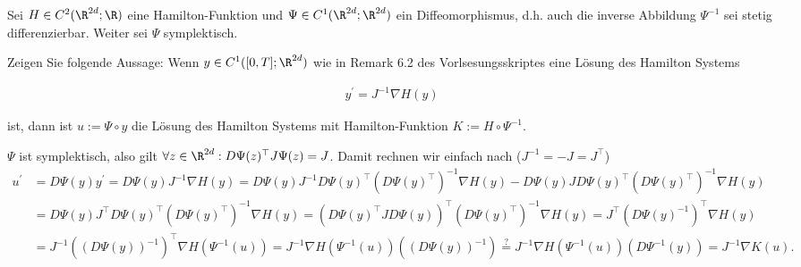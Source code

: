 \begin{exercise}
  Sei $H \in C^2(\R^{2d};\R)$ eine Hamilton-Funktion und
  $\Psi \in C^1(\R^{2d};\R^{2d})$ ein Diffeomorphismus,
  d.h. auch die inverse Abbildung $\Psi^{-1}$ sei stetig
  differenzierbar. Weiter sei $\Psi$ symplektisch.

  Zeigen Sie folgende Aussage: Wenn $y \in C^1([0,T];\R^{2d})$
  wie in Remark 6.2 des Vorlsesungsskriptes eine Lösung des
  Hamilton Systems

  \begin{align}
    y^\prime = J^{-1}\nabla H(y)
  \end{align}

  ist, dann ist $u := \Psi \circ y$ die Lösung des Hamilton
  Systems mit Hamilton-Funktion $K := H \circ \Psi^{-1}$.
\end{exercise}

\begin{solution}
  $\Psi$ ist symplektisch, also gilt $\forall z \in \R^{2d}: D\Psi(z)^{\top}J\Psi(z) = J$.
  Damit rechnen wir einfach nach ($J^{-1} = -J = J^{\top}$)
  \begin{align*}
    u^{\prime} &= D \Psi(y)y^{\prime} = D\Psi(y)J^{-1}\nabla H(y) =  D\Psi(y)J^{-1}D\Psi(y)^{\top}(D\Psi(y)^{\top})^{-1}\nabla H(y)
    -D\Psi(y)JD\Psi(y)^{\top}(D\Psi(y)^{\top})^{-1}\nabla H(y) \\
    &= D\Psi(y)J^{\top}D\Psi(y)^{\top}(D\Psi(y)^{\top})^{-1}\nabla H(y)
    = (D\Psi(y)^{\top}JD\Psi(y))^{\top}(D\Psi(y)^{\top})^{-1}\nabla H(y)
    = J^{\top}(D\Psi(y)^{-1})^{\top}\nabla H(y) \\
    &= J^{-1}((D\Psi(y))^{-1})^{\top}\nabla H(\Psi^{-1}(u))
    = J^{-1}\nabla H(\Psi^{-1}(u))((D\Psi(y))^{-1}) \stackrel{?}{=}
    J^{-1}\nabla H(\Psi^{-1}(u))(D\Psi^{-1}(y)) = J^{-1}\nabla K(u).
  \end{align*}

\end{solution}
